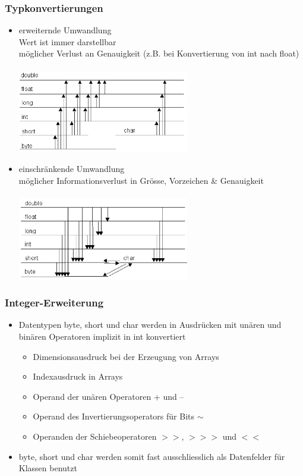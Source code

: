 \documentclass[a4paper,10pt]{article}
\begin{document}
\subsubsection{Typkonvertierungen}
\begin{itemize}
	\item erweiternde Umwandlung \\
		Wert ist immer darstellbar \\
		möglicher Verlust an Genauigkeit (z.B. bei Konvertierung von int nach float) \\ \\
		\includegraphics[width=75mm]{erweiternde_typumwandlung.png} \\
		
	\item einschränkende Umwandlung \\
		möglicher Informationsverlust in Grösse, Vorzeichen \& Genauigkeit \\ \\
		\includegraphics[width=75mm]{einschraenkende_typumwandlung.png}
\end{itemize}

\subsubsection{Integer-Erweiterung}
\begin{itemize}
	\item Datentypen byte, short und char werden in Ausdrücken mit unären und binären Operatoren implizit in int konvertiert
		\begin{itemize}
			\item Dimensionsausdruck bei der Erzeugung von Arrays
			\item Indexausdruck in Arrays
			\item Operand der unären Operatoren + und –
			\item Operand des Invertierungsoperators für Bits $\sim$
			\item Operanden der Schiebeoperatoren $>>$, $>>>$ und $<<$
		\end{itemize}
	\item byte, short und char werden somit fast ausschliesslich als Datenfelder für Klassen benutzt
\end{itemize}
\end{document}
